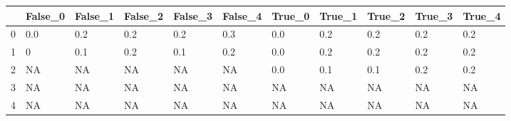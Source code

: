 \begin{tabular}{lllllllllll}
\toprule
{} & False\_0 & False\_1 & False\_2 & False\_3 & False\_4 & True\_0 & True\_1 & True\_2 & True\_3 & True\_4 \\ \hline
\midrule
0 &     0.0 &     0.2 &     0.2 &     0.2 &     0.3 &    0.0 &    0.2 &    0.2 &    0.2 &    0.2 \\ \hline
1 &       0 &     0.1 &     0.2 &     0.1 &     0.2 &    0.0 &    0.2 &    0.2 &    0.2 &    0.2 \\ \hline
2 &      NA &      NA &      NA &      NA &      NA &    0.0 &    0.1 &    0.1 &    0.2 &    0.2 \\ \hline
3 &      NA &      NA &      NA &      NA &      NA &     NA &     NA &     NA &     NA &     NA \\ \hline
4 &      NA &      NA &      NA &      NA &      NA &     NA &     NA &     NA &     NA &     NA \\ \hline
\bottomrule
\end{tabular}
